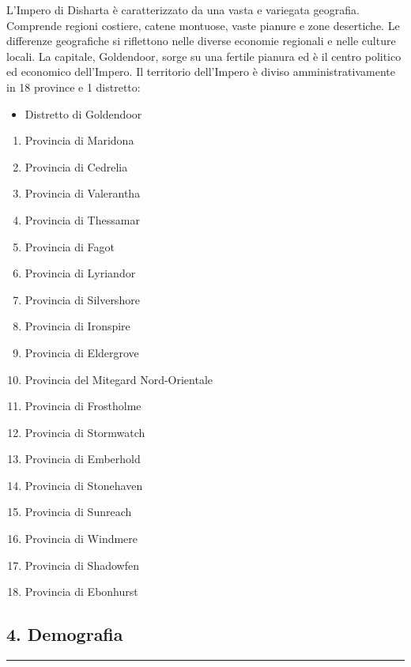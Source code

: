 L'Impero di Disharta è caratterizzato da una vasta e variegata
geografia. Comprende regioni costiere, catene montuose, vaste pianure e
zone desertiche. Le differenze geografiche si riflettono nelle diverse
economie regionali e nelle culture locali. La capitale, Goldendoor,
sorge su una fertile pianura ed è il centro politico ed economico
dell'Impero. Il territorio dell'Impero è diviso amministrativamente in
18 province e 1 distretto:

\begin{itemize}
\tightlist
\item
  Distretto di Goldendoor
\end{itemize}

\begin{enumerate}
\def\labelenumi{\arabic{enumi}.}
\tightlist
\item
  Provincia di Maridona
\item
  Provincia di Cedrelia
\item
  Provincia di Valerantha
\item
  Provincia di Thessamar
\item
  Provincia di Fagot
\item
  Provincia di Lyriandor
\item
  Provincia di Silvershore
\item
  Provincia di Ironspire
\item
  Provincia di Eldergrove
\item
  Provincia del Mitegard Nord-Orientale
\item
  Provincia di Frostholme
\item
  Provincia di Stormwatch
\item
  Provincia di Emberhold
\item
  Provincia di Stonehaven
\item
  Provincia di Sunreach
\item
  Provincia di Windmere
\item
  Provincia di Shadowfen
\item
  Provincia di Ebonhurst
\end{enumerate}

\subsection{4. Demografia}\label{demografia}

\begin{center}\rule{0.5\linewidth}{0.5pt}\end{center}

